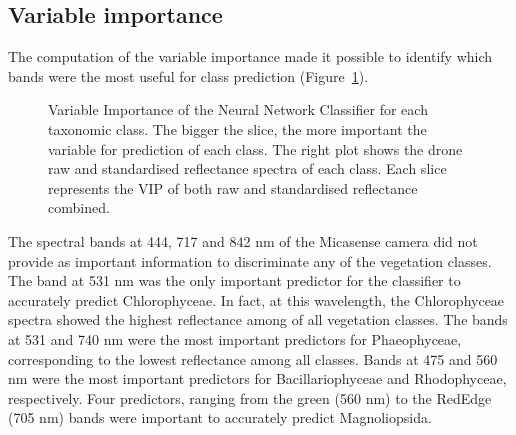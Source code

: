 \documentclass[
  number]{elsarticle}
\begin{document}
\subsection{Variable importance}\label{variable-importance}

The computation of the variable importance made it possible to identify
which bands were the most useful for class prediction
(Figure~\ref{fig-VIP}).

\label{cell-fig-VIP}
\begin{figure}[H]


\caption{\label{fig-VIP}Variable Importance of the Neural Network
Classifier for each taxonomic class. The bigger the slice, the more
important the variable for prediction of each class. The right plot
shows the drone raw and standardised reflectance spectra of each class.
Each slice represents the VIP of both raw and standardised reflectance
combined.}

\end{figure}%

The spectral bands at 444, 717 and 842 nm of the Micasense camera did
not provide as important information to discriminate any of the
vegetation classes. The band at 531 nm was the only important predictor
for the classifier to accurately predict Chlorophyceae. In fact, at this
wavelength, the Chlorophyceae spectra showed the highest reflectance
among of all vegetation classes. The bands at 531 and 740 nm were the
most important predictors for Phaeophyceae, corresponding to the lowest
reflectance among all classes. Bands at 475 and 560 nm were the most
important predictors for Bacillariophyceae and Rhodophyceae,
respectively. Four predictors, ranging from the green (560 nm) to the
RedEdge (705 nm) bands were important to accurately predict
Magnoliopsida.
\end{document}
